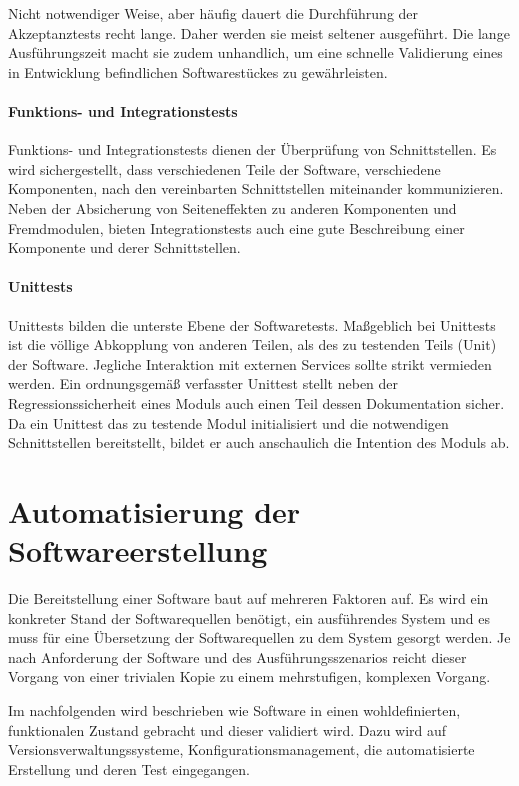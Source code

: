 Nicht notwendiger Weise, aber häufig dauert die Durchführung der Akzeptanztests recht lange. Daher werden sie meist seltener ausgeführt. Die lange Ausführungszeit macht sie zudem unhandlich, um eine schnelle Validierung eines in Entwicklung befindlichen Softwarestückes zu gewährleisten.

\paragraph{Funktions- und Integrationstests}

Funktions- und Integrationstests dienen der Überprüfung von Schnittstellen. Es wird sichergestellt, dass verschiedenen Teile der Software, verschiedene Komponenten, nach den vereinbarten Schnittstellen miteinander kommunizieren.
Neben der Absicherung von Seiteneffekten zu anderen Komponenten und Fremdmodulen, bieten Integrationstests auch eine gute Beschreibung einer Komponente und derer Schnittstellen.

\paragraph{Unittests}

Unittests bilden die unterste Ebene der Softwaretests. Maßgeblich bei Unittests ist die völlige Abkopplung von anderen Teilen, als des zu testenden Teils (Unit) der Software. Jegliche Interaktion mit externen Services sollte strikt vermieden werden.
Ein ordnungsgemäß verfasster Unittest stellt neben der Regressionssicherheit eines Moduls auch einen Teil dessen Dokumentation sicher. Da ein Unittest das zu testende Modul initialisiert und die notwendigen Schnittstellen bereitstellt, bildet er auch anschaulich die Intention des Moduls ab.

\section{Automatisierung der Softwareerstellung}

Die Bereitstellung einer Software baut auf mehreren Faktoren auf. Es wird ein konkreter Stand der Softwarequellen benötigt, ein ausführendes System und es muss für eine Übersetzung der Softwarequellen zu dem System gesorgt werden.
Je nach Anforderung der Software und des Ausführungsszenarios reicht dieser Vorgang von einer trivialen Kopie zu einem mehrstufigen, komplexen Vorgang. 

Im nachfolgenden wird beschrieben wie Software in einen wohldefinierten, funktionalen Zustand gebracht und dieser validiert wird. Dazu wird auf Versionsverwaltungssysteme, Konfigurationsmanagement, die automatisierte Erstellung und deren Test eingegangen.

